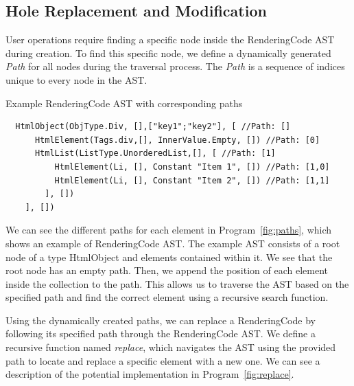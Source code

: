 \subsection{Hole Replacement and Modification}

User operations require finding a specific node inside the RenderingCode AST during creation.
To find this specific node, we define a dynamically generated \emph{Path} for all nodes during the traversal process.
The \emph{Path} is a sequence of indices unique to every node in the AST.

\begin{listing}[htbp]
	\caption {Example RenderingCode AST with corresponding paths}
	\label{fig:paths}
	\begin{lstlisting}
  HtmlObject(ObjType.Div, [],["key1";"key2"], [ //Path: []
      HtmlElement(Tags.div,[], InnerValue.Empty, []) //Path: [0]
      HtmlList(ListType.UnorderedList,[], [ //Path: [1]
          HtmlElement(Li, [], Constant "Item 1", []) //Path: [1,0]
          HtmlElement(Li, [], Constant "Item 2", []) //Path: [1,1]
        ], [])
    ], [])
  \end{lstlisting}
\end{listing}

We can see the different paths for each element in Program~\ref{fig:paths}, which shows an example of RenderingCode AST.
The example AST consists of a root node of a type HtmlObject and elements contained within it.
We see that the root node has an empty path.
Then, we append the position of each element inside the collection to the path.
This allows us to traverse the AST based on the specified path and find the correct element using a recursive search function.

Using the dynamically created paths, we can replace a RenderingCode by following its specified path through the RenderingCode AST.
We define a recursive function named \emph{replace}, which navigates the AST using the provided path to locate and replace a specific element with a new one.
We can see a description of the potential implementation in Program~\ref{fig:replace}.

